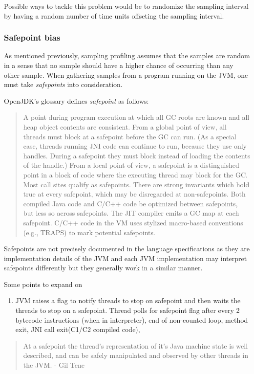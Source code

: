 \documentclass[..thesis.tex]{subfiles}
\begin{document}
Possible ways to tackle this problem would be to randomize the sampling interval by having a random number of time units offseting the sampling interval.
\subsubsection{Safepoint bias}
As mentioned previously, sampling profiling assumes that the samples are random in a sense that no sample should have a higher chance of occurring than any other sample. When gathering samples from a program running on the JVM, one must take \textit{safepoints} into consideration.

OpenJDK's glossary \cite{jdk_glossary} defines \textit{safepoint} as follows: 
\begin{quote}
A point during program execution at which all GC roots are known and all heap object contents are consistent. From a global point of view, all threads must block at a safepoint before the GC can run. (As a special case, threads running JNI code can continue to run, because they use only handles. During a safepoint they must block instead of loading the contents of the handle.) From a local point of view, a safepoint is a distinguished point in a block of code where the executing thread may block for the GC. Most call sites qualify as safepoints. There are strong invariants which hold true at every safepoint, which may be disregarded at non-safepoints. Both compiled Java code and C/C++ code be optimized between safepoints, but less so across safepoints. The JIT compiler emits a GC map at each safepoint. C/C++ code in the VM uses stylized macro-based conventions (e.g., TRAPS) to mark potential safepoints.
\end{quote}

Safepoints are not precisely documented in the language specifications as they are implementation details of the JVM and each JVM implementation may interpret safepoints differently but they generally work in a similar manner. 


Some points to expand on
\begin{enumerate}
	\item JVM raises a flag to notify threads to stop on safepoint and then waits the threads to stop on a safepoint. Thread polls for safepoint flag after every 2 bytecode instructions (when in interpreter), end of non-counted loop, method exit, JNI call exit(C1/C2 compiled code), 
\end{enumerate}
\begin{quote}
At a safepoint the thread's representation of it's Java machine state is well described, and can be safely manipulated and observed by other threads in the JVM. - Gil Tene
\end{quote}
\end{document}
